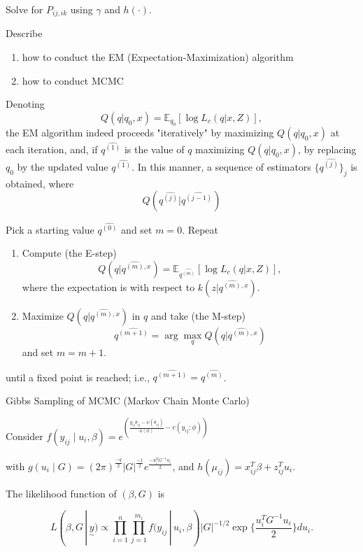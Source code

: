 \documentclass[UTF8,a4paper,10pt]{article}
\begin{document}
{{{Solve for \(P_{ij,ik}\)
  using \(\gamma\) and \(h(\cdot)\).

\pagebreak
\begin{Problem}[]{}
  Describe
  \begin{enumerate}
    \item how to conduct the EM (Expectation-Maximization) algorithm
    \item how to conduct  MCMC
  \end{enumerate}
    
  \end{Problem}
  Denoting
  \[ Q(q|q_0, x) = \mathbb{E}_{q_0} \left[ \log L_c(q|x,Z) \right], \]
  the EM algorithm indeed proceeds "iteratively" by maximizing \(Q(q|q_0, x)\) at each iteration, and, if \(q^{\hat{(1)}}\) is the value of \(q\) maximizing \(Q(q|q_0, x)\), by replacing \(q_0\) by the updated value \(q^{\hat{(1)}}\). In this manner, a sequence of estimators \(\{q^{\hat{(j)}}\}_j\) is obtained, where
  \[ Q(q^{\hat{(j)}}|q^{\hat{(j-1)}}) \]

  Pick a starting value \(q^{\hat{(0)}}\) and set \(m = 0\).
Repeat
\begin{enumerate}
  \item Compute (the E-step) \[ Q(q|q^{\hat{(m)}, x}) = \mathbb{E}_{q^{\hat{(m)}}} \left[ \log L_c(q|x,Z) \right], \]where the expectation is with respect to \(k(z|q^{\hat{(m)}, x})\).
  \item Maximize \(Q(q|q^{\hat{(m)}, x})\) in \(q\) and take (the M-step)   \[ q^{\hat{(m+1)}} = \arg\max_q Q(q|q^{\hat{(m)}, x}) \] and set \(m = m+1\).
\end{enumerate}

until a fixed point is reached; i.e., \(q^{\hat{(m+1)}} = q^{\hat{(m)}}\).

  

\dotfill

Gibbs Sampling of MCMC (Markov Chain Monte Carlo)



Consider $f\left(y_{i j} \mid u_{i}, \beta\right)=e^{\left(\frac{y_{i j} \theta_{i j}-\psi\left(\theta_{i j}\right)}{a(\phi)}-c\left(y_{i j} ; \phi\right)\right)}$ 

with $g\left(u_{i} \mid G\right)=(2 \pi)^{\frac{-q}{2}}|G|^{\frac{-1}{2}} e^{\frac{-u_{i}^{T} G^{-1} u_{i}}{2}}$, and $h\left(\mu_{i j}\right)=x_{i j}^{T} \beta+z_{i j}^{T} u_{i}$.

The likelihood function of $(\beta, G)$ is

\[L(\beta, G\,|\,  \underset{\sim}{y})\propto \prod_{i=1}^n\prod_{j=1}^{m_i}f(y_{ij}\,|\,u_i,\beta)|G|^{-1/2}\exp\{\frac{u_i^TG^{-1}u_i}{2}\}du_i. \]

}}}
\end{document}
